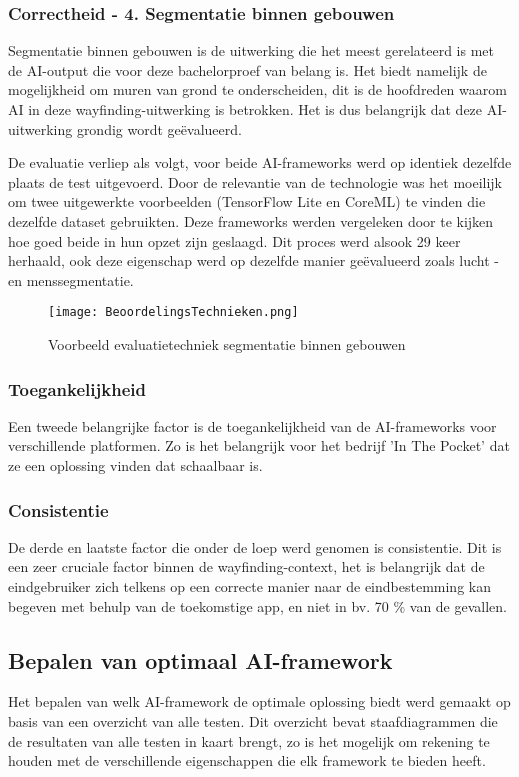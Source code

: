 \subsubsection{Correctheid - 4. Segmentatie binnen gebouwen}
Segmentatie binnen gebouwen is de uitwerking die het meest gerelateerd is met de AI-output die voor deze bachelorproef van belang is. Het biedt namelijk de mogelijkheid om muren van grond te onderscheiden, dit is de hoofdreden waarom AI in deze wayfinding-uitwerking is betrokken. Het is dus belangrijk dat deze AI-uitwerking grondig wordt geëvalueerd.

De evaluatie verliep als volgt, voor beide AI-frameworks werd op identiek dezelfde plaats de test uitgevoerd. Door de relevantie van de technologie was het moeilijk om twee uitgewerkte voorbeelden (TensorFlow Lite en CoreML) te vinden die dezelfde dataset gebruikten. Deze frameworks werden vergeleken door te kijken hoe goed beide in hun opzet zijn geslaagd. Dit proces werd alsook 29 keer herhaald, ook deze eigenschap werd op dezelfde manier geëvalueerd zoals lucht -en menssegmentatie.
\begin{figure}[H]
	\centering
	\texttt{[image: BeoordelingsTechnieken.png]}
	\caption{Voorbeeld evaluatietechniek segmentatie binnen gebouwen}
\end{figure}

\subsubsection{Toegankelijkheid}
Een tweede belangrijke factor is de toegankelijkheid van de AI-frameworks voor verschillende platformen. Zo is het belangrijk voor het bedrijf 'In The Pocket' dat ze een oplossing vinden dat schaalbaar is.

\subsubsection{Consistentie}
De derde en laatste factor die onder de loep werd genomen is consistentie. Dit is een zeer cruciale factor binnen de wayfinding-context, het is belangrijk dat de eindgebruiker zich telkens op een correcte manier naar de eindbestemming kan begeven met behulp van de toekomstige app, en niet in bv. 70 \% van de gevallen.

\subsection{Bepalen van optimaal AI-framework}
Het bepalen van welk AI-framework de optimale oplossing biedt werd gemaakt op basis van een overzicht van alle testen. Dit overzicht bevat staafdiagrammen die de resultaten van alle testen in kaart brengt, zo is het mogelijk om rekening te houden met de verschillende eigenschappen die elk framework te bieden heeft.

